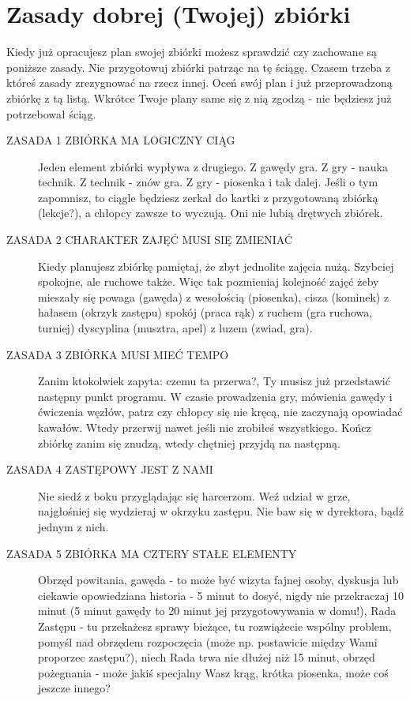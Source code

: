 \section{Zasady dobrej (Twojej) zbiórki}
Kiedy już opracujesz plan swojej zbiórki możesz sprawdzić czy zachowane są poniższe zasady. Nie przygotowuj zbiórki patrząc na tę ściągę. Czasem trzeba z któreś zasady zrezygnować na rzecz innej. Oceń swój plan i już  przeprowadzoną zbiórkę z tą listą. Wkrótce Twoje plany same się z nią zgodzą - nie będziesz już potrzebował ściąg.
\begin{description}


\item
[ZASADA 1 ZBIÓRKA MA LOGICZNY  CIĄG]
Jeden element zbiórki wypływa z drugiego. 
Z gawędy gra. 
Z gry - nauka  technik. 
Z technik - znów gra. 
Z gry - piosenka i tak dalej. 
Jeśli o tym zapomnisz, to ciągle będziesz zerkał do kartki z przygotowaną zbiórką (lekcje?),  a chłopcy zawsze to wyczują. 
Oni nie lubią drętwych zbiórek.
\item 
[ZASADA 2 CHARAKTER ZAJĘĆ MUSI  SIĘ ZMIENIAĆ]
Kiedy planujesz zbiórkę pamiętaj, że zbyt jednolite zajęcia nużą. 
Szybciej  spokojne, ale ruchowe także. 
Więc tak pozmieniaj kolejność zajęć  żeby mieszały się powaga (gawęda) z wesołością (piosenka), cisza (kominek) z hałasem (okrzyk  zastępu) spokój (praca rąk) z ruchem (gra ruchowa, turniej) dyscyplina (musztra, apel)  z luzem (zwiad,  gra).
\item
[ZASADA 3 ZBIÓRKA MUSI MIEĆ TEMPO]
Zanim ktokolwiek zapyta: czemu ta przerwa?, Ty musisz już przedstawić następny punkt programu. W czasie prowadzenia  gry,  mówienia gawędy i ćwiczenia węzłów, patrz czy  chłopcy się nie kręcą, nie zaczynają opowiadać kawałów. 
Wtedy  przerwij nawet jeśli nie zrobiłeś wszystkiego. 
Kończ  zbiórkę zanim się znudzą, wtedy chętniej przyjdą na następną.
\item
[ZASADA  4 ZASTĘPOWY JEST Z NAMI]
Nie siedź  z boku przyglądając się harcerzom. 
Weź udział w grze, najgłośniej się wydzieraj w okrzyku zastępu. 
Nie baw się w dyrektora, bądź jednym  z nich.
\item
[ZASADA  5 ZBIÓRKA  MA  CZTERY  STAŁE  ELEMENTY]
Obrzęd powitania, gawęda - to może być  wizyta fajnej osoby, dyskusja lub ciekawie opowiedziana historia - 5 minut to dosyć, nigdy nie przekraczaj 10 minut (5 minut gawędy to 20 minut jej przygotowywania w domu!), Rada Zastępu - tu  przekażesz sprawy bieżące,  tu  rozwiążecie wspólny problem, pomyśl nad obrzędem rozpoczęcia (może np. postawicie między Wami proporzec zastępu?), niech Rada trwa nie dłużej niż 15 minut, obrzęd pożegnania -  może jakiś specjalny Wasz krąg, krótka piosenka, może coś jeszcze innego?

\end{description}
